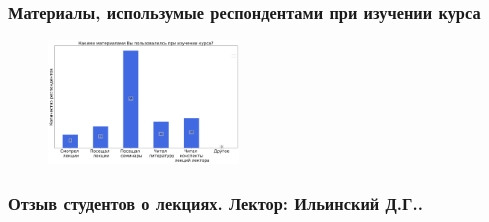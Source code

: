 	\subsubsection{Материалы, использумые респондентами при изучении курса}

		\begin{figure}[H]
			\centering
			\includegraphics[width = 0.45\textwidth]{images/1 course/Дискретный анализ/materials.png}
		\end{figure}

	\subsubsection{Отзыв студентов о лекциях. Лектор: Ильинский Д.Г..}


